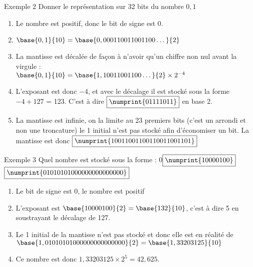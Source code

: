 \documentclass[10pt]{beamer}
\begin{document}
\begin{frame}{\Ctitle}{\stitle}
    \begin{exampleblock}{Exemple 2}
        Donner le représentation sur 32 bits du nombre $0,1$
        \begin{enumerate}
            \item<2-> Le nombre est positif, donc le bit de signe est \textcolor{BrickRed}{$\boxed{0}$}.
            \item<3-> $\base{0,1}{10} = \base{0,000110011001100\dots}{2}$
            \item<4-> La mantisse est décalée de façon à n'avoir qu'un chiffre non nul avant la virgule : \\
            $\base{0,1}{10} = \base{1,10011001100\dots}{2} \times 2^{-4}$
            \item<5-> L'exposant est donc $-4$, et avec le décalage il est stocké sous la forme $-4+127$ = 123. C'est à dire \textcolor{blue}{$\boxed{\numprint{01111011}}$} en base 2. 
            \item<6-> La mantisse est infinie, on la limite au 23 premiers bits (c'est un arrondi et non une troncature) le 1 initial  n'est pas stocké afin d'économiser un bit. La mantisse est donc \textcolor{OliveGreen}{$\boxed{\numprint{10011001100110011001101}}$}
        \end{enumerate}
    \end{exampleblock}
\end{frame}

\begin{frame}{\Ctitle}{\stitle}
    \begin{exampleblock}{Exemple 3}
        Quel nombre est stocké sous la forme : 
        \textcolor{BrickRed}{$\boxed{0}$}\textcolor{blue}{$\boxed{\numprint{10000100}}$}\textcolor{OliveGreen}{$\boxed{\numprint{01010101000000000000000}}$}
        \begin{enumerate}
            \item<1-> Le bit de signe est 0, le nombre est positif
            \item<2-> L'exposant est $\base{10000100}{2} = \base{132}{10}$, c'est à dire 5 en soustrayant le décalage de 127.
            \item<3-> Le 1 initial de la mantisse n'est pas stocké et donc elle est en réalité de $\base{1,01010101000000000000000}{2}=\base{1,33203125}{10}$
            \item<4-> Ce nombre est donc $1,33203125 \times 2^5 = 42,625$.
        \end{enumerate}
    \end{exampleblock}
\end{frame}
\end{document}
